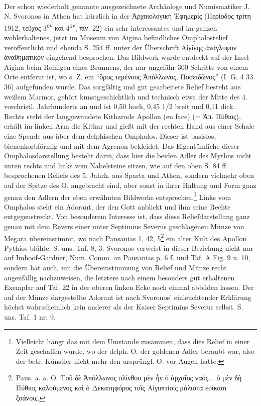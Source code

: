 \documentclass[a4paper, 11pt, oneside]{article}
\begin{document}
\paragraph{}
Der schon wiederholt genannte ausgezeichnete Archäologe und Numismatiker J. N. Svoronos in Athen hat kürzlich in der Ἀρχαιολογικὴ Ἐφημερίς (Περίοδος τρίτη 1912, τεῦχος 3\textsuperscript{ον} καὶ 4\textsuperscript{ον}, πίν. 22) ein sehr interessantes und im ganzen wohlerhaltenes, jetzt im Museum von Aigina befindliches Omphalosrelief veröffentlicht und ebenda S. 254 ff. unter der Überschrift Αἰγίνης ἀνάγλυφον ἀναθηματικόν eingehend besprochen. Das Bildwerk wurde entdeckt auf der Insel Aigina beim Reinigen eines Brunnens, der nur ungefähr 300 Schritte von einem Orte entfernt ist, wo s. Z. ein "`ὅρος τεμένους Ἀπόλλωνος, Ποσειδῶνος"' (I. G. 4 33. 36) aufgefunden wurde. Das sorgfältig und gut gearbeitete Relief besteht aus weißem Marmor, gehört kunstgeschichtlich und technisch etwa der Mitte des 4. vorchristl. Jahrhunderts an und ist 0,50 hoch, 0,45 1/2 breit und 0,11 dick. Rechts steht der langgewandete Kitharode Apollon (en face) (= Ἀπ. Πύθιος), erhält im linken Arm die Kithar und gießt mit der rechten Hand aus einer Schale eine Spende aus über dem delphischen Omphalos. Dieser ist basislos, bienenkorbförmig und mit dem Agrenon bekleidet. Das Eigentümliche dieser Omphalosdarstellung besteht darin, dass hier die beiden Adler des Mythus nicht unten rechts und links vom Nabelsteine sitzen, wie auf den oben S. 84 ff. besprochenen Reliefs des 5. Jahrh. aus Sparta und Athen, sondern vielmehr oben auf der Spitze des O. angebracht sind, aber sonst in ihrer Haltung und Form ganz genau den Adlern der eben erwähnten Bildwerke entsprechen.\footnote{Vielleicht hängt das mit dem Umstande zusammen, dass dies Relief in einer Zeit geschaffen wurde, wo der delph. O. der goldenen Adler beraubt war, also der betr. Künstler nicht mehr den ursprüngl. O. vor Augen hatte.} Links vom Omphalos steht ein Adorant, der den Gott anblickt und ihm seine Rechte entgegenstreckt. Von besonderem Interesse ist, dass diese Reliefdarstellung ganz genau mit dem Revers einer unter Septimius Severus geschlagenen Münze von Megara übereinstimmt, wo nach Pausanias 1, 42, 5\footnote{Paus. a. a. O. Τοῦ δὲ Ἀπόλλωνος πλίνθου μὲν ἦν ὁ ἀρχαῖος ναός... ὁ μὲν δὴ Πύθιος καλούμενος καὶ ὁ Δεκατηφόρος τοῖς Αἰγυπτίοις μάλιστα ἐοίκασι ξοάνοις.} ein alter Kult des Apollon Pythios blühte. S. uns. Taf. 8, 3. Svoronos verweist in dieser Beziehung nicht nur auf Imhoof-Gardner, Num. Comm. on Pausanias p. 6 f. und Taf. A Fig. 9 u. 10, sondern hat auch, um die Übereinstimmung von Relief und Münze recht augenfällig nachzuweisen, die letztere nach einem besonders gut erhaltenen Exemplar auf Taf. 22 in der oberen linken Ecke noch einmal abbilden lassen. Der auf der Münze dargestellte Adorant ist nach Svoronos' einleuchtender Erklärung höchst wahrscheinlich kein anderer als der Kaiser Septimius Severus selbst. S. uns. Taf. 1 nr. 9.
\end{document}
